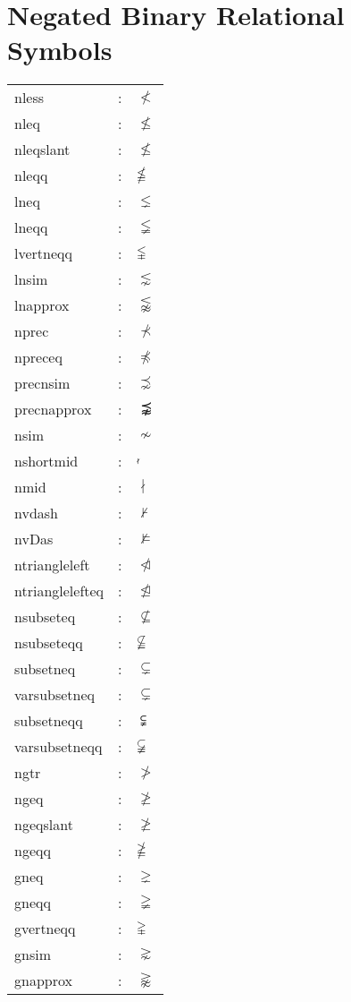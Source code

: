 \documentclass{article}
\begin{document}
\section{Negated Binary Relational Symbols}
\begin{tabular}{lll}
nless & : & $\nless$\\
nleq & : & $\nleq$\\
nleqslant & : & $\nleqslant$\\
nleqq & : & $\nleqq$\\ 
lneq & : & $\lneq$\\
lneqq & : & $\lneqq$\\
lvertneqq & : & $\lvertneqq$\\
lnsim & : & $\lnsim$\\
lnapprox & : & $\lnapprox$\\
nprec & : & $\nprec$\\
npreceq & : & $\npreceq$\\ 
precnsim & : & $\precnsim$\\
precnapprox & : & $\precnapprox$\\
nsim & : & $\nsim$\\
nshortmid & : & $\nshortmid$\\
nmid& : & $\nmid$\\
nvdash & : & $\nvdash$\\
nvDas & : & $\nvDash$\\
ntriangleleft & : & $\ntriangleleft$\\
ntrianglelefteq & : & $\ntrianglelefteq$\\
nsubseteq & : & $\nsubseteq$\\
nsubseteqq & : & $\nsubseteqq$\\
subsetneq & : & $\subsetneq$\\
varsubsetneq & : & $\varsubsetneq$\\
subsetneqq & : & $\subsetneqq$\\
varsubsetneqq & : & $\varsubsetneqq$\\
ngtr & : & $\ngtr$\\
ngeq & : & $\ngeq$\\
ngeqslant & : & $\ngeqslant$\\
ngeqq & : & $\ngeqq$\\
gneq & : & $\gneq$\\
gneqq & : & $\gneqq$\\
gvertneqq & : & $\gvertneqq$\\
gnsim & : & $\gnsim$\\
gnapprox & : & $\gnapprox$\\

\end{tabular}
\end{document}
